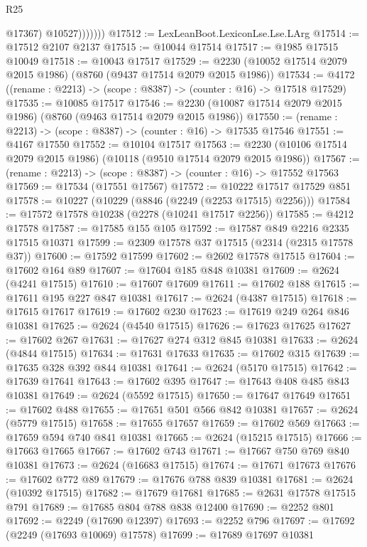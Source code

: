 \begin{lexlean}{R25}
\begin{coremodule}
                    @17367)
                  @10527)))))))
@17512 := LexLeanBoot.LexiconLse.Lse.LArg
@17514 := @17512 @2107 @2137
@17515 := @10044 @17514
@17517 := @1985 @17515 @10049
@17518 := @10043 @17517
@17529 := @2230 (@10052 @17514 @2079 @2015 @1986) (@8760 (@9437 @17514 @2079 @2015 @1986))
@17534 := @4172 ((rename : @2213) -> (scope : @8387) -> (counter : @16) -> @17518 @17529)
@17535 := @10085 @17517
@17546 := @2230 (@10087 @17514 @2079 @2015 @1986) (@8760 (@9463 @17514 @2079 @2015 @1986))
@17550 := (rename : @2213) -> (scope : @8387) -> (counter : @16) -> @17535 @17546
@17551 := @4167 @17550
@17552 := @10104 @17517
@17563 := @2230 (@10106 @17514 @2079 @2015 @1986) (@10118 (@9510 @17514 @2079 @2015 @1986))
@17567 := (rename : @2213) -> (scope : @8387) -> (counter : @16) -> @17552 @17563
@17569 := @17534 (@17551 @17567)
@17572 := @10222 @17517 @17529 @851
@17578 := @10227 (@10229 (@8846 (@2249 (@2253 @17515) @2256)))
@17584 := @17572 @17578 @10238 (@2278 (@10241 @17517 @2256))
@17585 := @4212 @17578
@17587 := @17585 @155 @105
@17592 := @17587 @849 @2216 @2335 @17515 @10371
@17599 := @2309 @17578 @37 @17515 (@2314 (@2315 @17578 @37))
@17600 := @17592 @17599
@17602 := @2602 @17578 @17515
@17604 := @17602 @164 @89
@17607 := @17604 @185 @848 @10381
@17609 := @2624 (@4241 @17515)
@17610 := @17607 @17609
@17611 := @17602 @188
@17615 := @17611 @195 @227 @847 @10381
@17617 := @2624 (@4387 @17515)
@17618 := @17615 @17617
@17619 := @17602 @230
@17623 := @17619 @249 @264 @846 @10381
@17625 := @2624 (@4540 @17515)
@17626 := @17623 @17625
@17627 := @17602 @267
@17631 := @17627 @274 @312 @845 @10381
@17633 := @2624 (@4844 @17515)
@17634 := @17631 @17633
@17635 := @17602 @315
@17639 := @17635 @328 @392 @844 @10381
@17641 := @2624 (@5170 @17515)
@17642 := @17639 @17641
@17643 := @17602 @395
@17647 := @17643 @408 @485 @843 @10381
@17649 := @2624 (@5592 @17515)
@17650 := @17647 @17649
@17651 := @17602 @488
@17655 := @17651 @501 @566 @842 @10381
@17657 := @2624 (@5779 @17515)
@17658 := @17655 @17657
@17659 := @17602 @569
@17663 := @17659 @594 @740 @841 @10381
@17665 := @2624 (@15215 @17515)
@17666 := @17663 @17665
@17667 := @17602 @743
@17671 := @17667 @750 @769 @840 @10381
@17673 := @2624 (@16683 @17515)
@17674 := @17671 @17673
@17676 := @17602 @772 @89
@17679 := @17676 @788 @839 @10381
@17681 := @2624 (@10392 @17515)
@17682 := @17679 @17681
@17685 := @2631 @17578 @17515 @791
@17689 := @17685 @804 @788 @838 @12400
@17690 := @2252 @801
@17692 := @2249 (@17690 @12397)
@17693 := @2252 @796
@17697 := @17692 (@2249 (@17693 @10069) @17578)
@17699 := @17689 @17697 @10381

\end{coremodule}
\end{lexlean}
